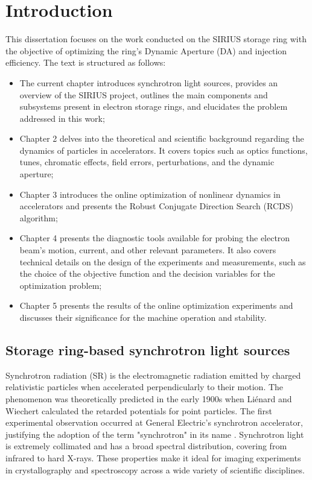 \chapter*{Introduction}
This dissertation focuses on the work conducted on the SIRIUS storage ring with the objective of optimizing the ring's Dynamic Aperture (DA) and injection efficiency. The text is structured as follows:
\begin{itemize}
    \item The current chapter introduces synchrotron light sources, provides an overview of the SIRIUS project, outlines the main components and subsystems present in electron storage rings, and elucidates the problem addressed in this work;
    \item Chapter 2 delves into the theoretical and scientific background regarding the dynamics of particles in accelerators. It covers topics such as optics functions, tunes, chromatic effects, field errors, perturbations, and the dynamic aperture;
    \item Chapter 3 introduces the online optimization of nonlinear dynamics in accelerators and presents the Robust Conjugate Direction Search (RCDS) algorithm;
    \item Chapter 4 presents the diagnostic tools available for probing the electron beam's motion, current, and other relevant parameters. It also covers technical details on the design of the experiments and measurements, such as the choice of the objective function and the decision variables for the optimization problem;
    \item Chapter 5 presents the results of the online optimization experiments and discusses their significance for the machine operation and stability.
\end{itemize}

\section*{Storage ring-based synchrotron light sources}

Synchrotron radiation (SR) is the electromagnetic radiation emitted by charged relativistic particles when accelerated perpendicularly to their motion. The phenomenon was theoretically predicted in the early 1900s when Liénard and Wiechert calculated the retarded potentials for point particles. The first experimental observation occurred at General Electric's synchrotron accelerator, justifying the adoption of the term "synchrotron" in its name \cite{wiedemann_particle_2015}. Synchrotron light is extremely collimated and has a broad spectral distribution, covering from infrared to hard X-rays. These properties make it ideal for imaging experiments in crystallography and spectroscopy across a wide variety of scientific disciplines.

